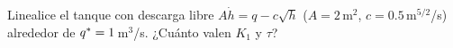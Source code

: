 \begin{pausa}
Linealice el tanque con descarga libre $A\dot h=q-c\sqrt h$ ($A=2$\,m$^2$, $c=0.5$\,m$^{5/2}$/s) alrededor de $q^{*}=1$\,m$^3$/s. ¿Cuánto valen $K_1$ y $\tau$?
\end{pausa}
